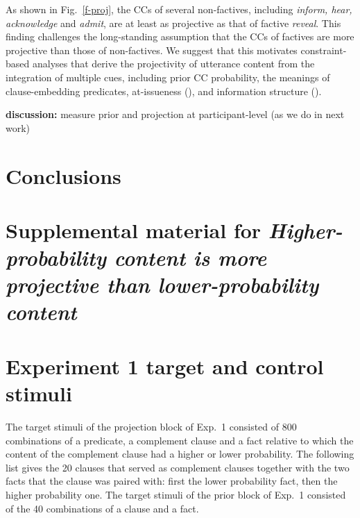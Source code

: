 \documentclass[11pt,fleqn]{article}
\newcommand{\6}{\mbox{$[\hspace*{-.6mm}[$}}
\newcommand{\9}{\mbox{$]\hspace*{-.6mm}]$}}
\begin{document}
As shown in Fig.~\ref{f-proj}, the CCs of several non-factives, including {\em inform, hear, acknowledge} and {\em admit}, are at least as projective as that of factive {\em reveal}. This finding challenges the long-standing assumption that the CCs of factives are more projective than those of non-factives. We suggest that this motivates constraint-based analyses that derive the projectivity of utterance content from the integration of multiple cues, including prior CC probability, the meanings of clause-embedding predicates, at-issueness (\citealt{tbd-variability}), and information structure (\citealt{tonhauser-salt26}).

{\bf discussion:} measure prior and projection at participant-level (as we do in next work)

\section{Conclusions}\label{s5}






\newpage

\appendix

\setcounter{table}{0}
\renewcommand{\thetable}{A\arabic{table}}

\setcounter{figure}{0}
\renewcommand{\thefigure}{A\arabic{figure}}

\section*{Supplemental material for {\em Higher-probability content is more projective than lower-probability content}}

\section{Experiment 1 target and control stimuli}\label{a-stim}

The target stimuli of the projection block of Exp.~1 consisted of 800 combinations of a predicate, a complement clause and a fact relative to which the content of the complement clause had a higher or lower probability. The following list gives the 20 clauses that served as complement clauses together with the two facts that the clause was paired with: first the lower probability fact, then the higher probability one. The target stimuli of the prior block of Exp.~1 consisted of the 40 combinations of a clause and a fact.
\end{document}
